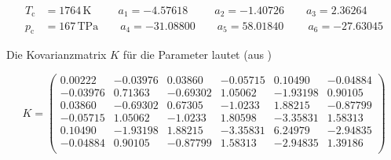 \begin{equation}
\label{eq:params}
\begin{split}
T_{\text{c}} &= 1764\,\text{K} \ \: \qquad a_1=-4.57618  \ \: \qquad a_2=-1.40726        \qquad a_3=2.36264\\
p_{\text{c}} &= 167\,\text{TPa}     \qquad a_4=-31.08800      \qquad a_5=58.01840  \  \qquad a_6=-27.63045
\end{split}
\end{equation}

Die Kovarianzmatrix $K$ für die Parameter lautet (aus \cite{manual})

\begin{equation}
\label{eq:cov}
K=
\left(
\begin{array}{cccccc}
 0.00222 & -0.03976 & 0.03860 & -0.05715 & 0.10490 & -0.04884 \\
 -0.03976 & 0.71363 & -0.69302 & 1.05062 & -1.93198 & 0.90105 \\
 0.03860 & -0.69302 & 0.67305 & -1.0233 & 1.88215 & -0.87799 \\
 -0.05715 & 1.05062 & -1.0233 & 1.80598 & -3.35831 & 1.58313 \\
 0.10490 & -1.93198 & 1.88215 & -3.35831 & 6.24979 & -2.94835 \\
 -0.04884 & 0.90105 & -0.87799 & 1.58313 & -2.94835 & 1.39186 \\
\end{array}
\right)
\end{equation}